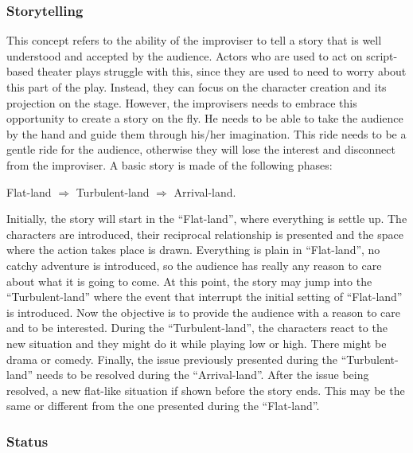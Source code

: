 \documentclass[11pt,a4paper,fleqn,twoside]{article}
\begin{document}
\subsubsection{Storytelling}

This concept refers to the ability of the improviser to tell a story that is well understood and accepted by the audience. Actors who are used to act on script-based theater plays struggle with this, since they are used to need to worry about this part of the play. Instead, they can focus on the character creation and its projection on the stage. However, the improvisers needs to embrace this opportunity to create a story on the fly. He needs to be able to take the audience by the hand and guide them through his/her imagination. This ride needs to be a gentle ride for the audience, otherwise they will lose the interest and disconnect from the improviser. A basic story is made of the following phases: \begin{center}Flat-land $\Longrightarrow$ Turbulent-land $\Longrightarrow$ Arrival-land. \end{center} Initially, the story will start in the ``Flat-land'', where everything is settle up. The characters are introduced, their reciprocal relationship is presented and the space where the action takes place is drawn. Everything is plain in ``Flat-land'', no catchy adventure is introduced, so the audience has really any reason to care about what it is going to come.
%
At this point, the story may jump into the ``Turbulent-land'' where the event that interrupt the initial setting of ``Flat-land'' is introduced. Now the objective is to provide the audience with a reason to care and to be interested. During the ``Turbulent-land'', the characters react to the new situation and they might do it while playing low or high. There might be drama or comedy.
%
Finally, the issue previously presented during the ``Turbulent-land'' needs to be resolved during the ``Arrival-land''. After the issue being resolved, a new flat-like situation if shown before the story ends. This may be the same or different from the one presented during the ``Flat-land''.

\subsubsection{Status}
\end{document}

